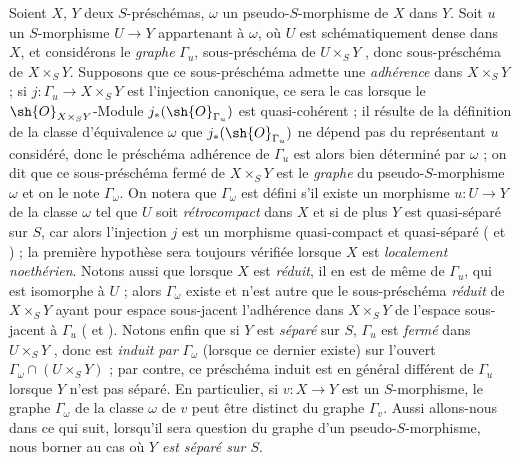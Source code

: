 \begin{env}[20.4.1]
\label{IV.20.4.1}
Soient $X$, $Y$ deux $S$-préschémas, $\omega$ un pseudo-$S$-morphisme de $X$ dans $Y$.
Soit $u$ un $S$-morphisme $U\to Y$ appartenant à $\omega$, où $U$ est schématiquement dense dans $X$, et considérons le \emph{graphe} $\Gamma_u$, sous-préschéma de $U\times_S Y$ , donc sous-préschéma de $X\times_S Y$.
Supposons que ce sous-préschéma admette une \emph{adhérence}  dans $X\times_S Y$ ; si $j:\Gamma_u\to X\times_S Y$ est l'injection canonique, ce sera le cas lorsque le $\sh{O}_{X\times_S Y}$-Module $j_*(\sh{O}_{\Gamma_u})$ est quasi-cohérent ; il résulte de la définition de la classe d'équivalence $\omega$  que $j_*(\sh{O}_{\Gamma_u})$ ne dépend pas du représentant $u$ considéré, donc le préschéma adhérence de $\Gamma_u$ est alors bien déterminé par $\omega$ ; on dit que ce sous-préschéma fermé de $X\times_S Y$ est le \emph{graphe} du pseudo-$S$-morphisme $\omega$ et on le note $\Gamma_\omega$.
On notera que $\Gamma_\omega$ est défini s'il existe un morphisme $u:U\to Y$ de la classe $\omega$ tel que $U$ soit \emph{rétrocompact} dans $X$ et si de plus $Y$ est quasi-séparé sur $S$, car alors l'injection $j$ est un morphisme quasi-compact et quasi-séparé ( et ) ; la première hypothèse sera toujours vérifiée lorsque $X$ est \emph{localement noethérien}.
Notons aussi que lorsque $X$ est \emph{réduit}, il en est de même de $\Gamma_u$, qui est isomorphe à $U$  ; alors $\Gamma_\omega$ existe et n'est autre que le sous-préschéma \emph{réduit} de $X\times_S Y$ ayant pour espace sous-jacent l'adhérence dans $X\times_S Y$ de l'espace sous-jacent à $\Gamma_u$ ( et ).
Notons enfin que si $Y$ est \emph{séparé} sur $S$, $\Gamma_u$ est \emph{fermé} dans $U\times_S Y$ , donc est \emph{induit par} $\Gamma_\omega$ (lorsque ce dernier existe) sur l'ouvert $\Gamma_\omega\cap(U\times_S Y)$  ; par contre, ce préschéma induit est en général différent de $\Gamma_u$ lorsque $Y$ n'est pas séparé.
En particulier, si $v:X\to Y$ est un $S$-morphisme, le graphe $\Gamma_\omega$ de la classe $\omega$ de $v$ peut être distinct du graphe $\Gamma_v$.
Aussi allons-nous dans ce qui suit, lorsqu'il sera question du graphe d'un pseudo-$S$-morphisme, nous borner au cas où \emph{$Y$ est séparé sur $S$}.
\end{env}

